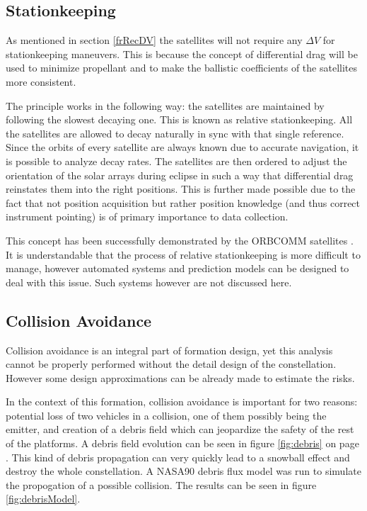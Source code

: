 \subsection{Stationkeeping}
\label{frSSStation}

As mentioned in section \ref{frRecDV} the satellites will not require any $\Delta V$ for stationkeeping maneuvers. This is because the concept of differential drag will be used to minimize propellant and to make the ballistic coefficients of the satellites more consistent.

The principle works in the following way: the satellites are maintained by following the slowest decaying one. This is known as relative stationkeeping. All the satellites are allowed to decay naturally in sync with that single reference. Since the orbits of every satellite are always known due to accurate navigation, it is possible to analyze decay rates. The satellites are then ordered to adjust the orientation of the solar arrays during eclipse in such a way that differential drag reinstates them into the right positions. This is further made possible due to the fact that not position acquisition but rather position knowledge (and thus correct instrument pointing) is of primary importance to data collection.

This concept has been successfully demonstrated by the ORBCOMM satellites \cite{constDesign}. It is understandable that the process of relative stationkeeping is more difficult to manage, however automated systems and prediction models can be designed to deal with this issue. Such systems however are not discussed here.  

\subsection{Collision Avoidance}
\label{frSSCA}

Collision avoidance is an integral part of formation design, yet this analysis cannot be properly performed without the detail design of the constellation. However some design approximations can be already made to estimate the risks.

In the context of this formation, collision avoidance is important for two reasons: potential loss of two vehicles in a collision, one of them possibly being the emitter, and creation of a debris field which can jeopardize the safety of the rest of the platforms. A debris field evolution can be seen in figure \ref{fig:debris} on page \pageref{fig:debris}. This kind of debris propagation can very quickly lead to a snowball effect and destroy the whole constellation. A NASA90 debris flux model was run to simulate the propogation of a possible collision. The results can be seen in figure \ref{fig:debrisModel}. 

